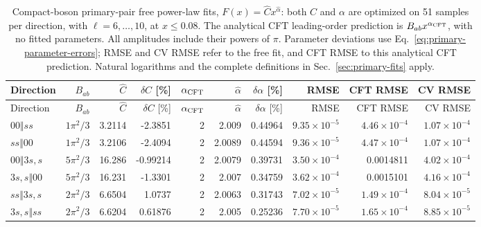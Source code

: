 \begin{longtable}{lrrrrrrrrr}
\caption{Compact-boson primary-pair free power-law fits, $F(x)=\widehat Cx^{\widehat\alpha}$: both $C$ and $\alpha$ are optimized on 51 samples per direction, with $\ell=6,\ldots,10$, at $x\leq0.08$. The analytical CFT leading-order prediction is $B_{ab}x^{\alpha_{\rm CFT}}$, with no fitted parameters. All amplitudes include their powers of $\pi$. Parameter deviations use Eq.~\eqref{eq:primary-parameter-errors}; RMSE and CV RMSE refer to the free fit, and CFT RMSE to this analytical CFT prediction. Natural logarithms and the complete definitions in Sec.~\ref{sec:primary-fits} apply.}
\label{tab:boson-primary-all-fits}\\\toprule
Direction & $B_{ab}$ & $\widehat C$ & $\delta C$ [\%] & $\alpha_{\rm CFT}$ & $\widehat\alpha$ & $\delta\alpha$ [\%] & RMSE & CFT RMSE & CV RMSE\\\midrule\endfirsthead
\toprule
Direction & $B_{ab}$ & $\widehat C$ & $\delta C$ [\%] & $\alpha_{\rm CFT}$ & $\widehat\alpha$ & $\delta\alpha$ [\%] & RMSE & CFT RMSE & CV RMSE\\\midrule\endhead
\bottomrule\endfoot
$00\Vert ss$ & $1\pi^{2}/3$ & 3.2114 & -2.3851 & 2 & 2.009 & 0.44964 & $9.35\!\times\!10^{-5}$ & $4.46\!\times\!10^{-4}$ & $1.07\!\times\!10^{-4}$\\
$ss\Vert 00$ & $1\pi^{2}/3$ & 3.2106 & -2.4094 & 2 & 2.0089 & 0.44594 & $9.36\!\times\!10^{-5}$ & $4.47\!\times\!10^{-4}$ & $1.07\!\times\!10^{-4}$\\
$00\Vert 3s,s$ & $5\pi^{2}/3$ & 16.286 & -0.99214 & 2 & 2.0079 & 0.39731 & $3.50\!\times\!10^{-4}$ & 0.0014811 & $4.02\!\times\!10^{-4}$\\
$3s,s\Vert 00$ & $5\pi^{2}/3$ & 16.231 & -1.3301 & 2 & 2.007 & 0.34759 & $3.62\!\times\!10^{-4}$ & 0.0015101 & $4.16\!\times\!10^{-4}$\\
$ss\Vert 3s,s$ & $2\pi^{2}/3$ & 6.6504 & 1.0737 & 2 & 2.0063 & 0.31743 & $7.02\!\times\!10^{-5}$ & $1.49\!\times\!10^{-4}$ & $8.04\!\times\!10^{-5}$\\
$3s,s\Vert ss$ & $2\pi^{2}/3$ & 6.6204 & 0.61876 & 2 & 2.005 & 0.25236 & $7.70\!\times\!10^{-5}$ & $1.65\!\times\!10^{-4}$ & $8.85\!\times\!10^{-5}$\\
\end{longtable}
